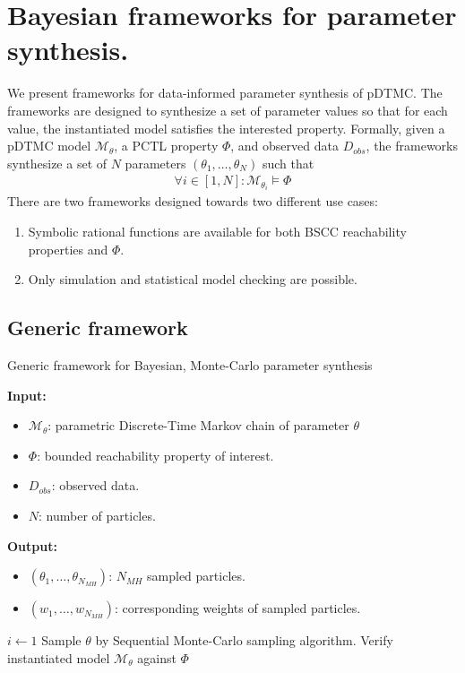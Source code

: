 \chapter{Bayesian frameworks for parameter synthesis.}
We present frameworks for data-informed parameter synthesis of pDTMC. The frameworks are designed to
synthesize a set of parameter values so that for each value, the instantiated model satisfies the
interested property. Formally, given a pDTMC model $\mathcal{M}_\theta$, a PCTL property $\Phi$, and
observed data $D_{obs}$, the frameworks synthesize a set of $N$ parameters
$(\theta_1,\ldots,\theta_N)$ such that
\begin{align*}
      \forall i \in [1,N]: \mathcal{M}_{\theta_i} \models \Phi
\end{align*}
There are two frameworks designed towards two different use cases:
\begin{enumerate}
      \item Symbolic rational functions are available for both BSCC reachability properties and $\Phi$.
      \item Only simulation and statistical model checking are possible.
\end{enumerate}

\section{Generic framework}
\begin{algorithm}[H]
      \caption{Generic framework for Bayesian, Monte-Carlo parameter synthesis}
      \label{alg:generic-framework}
      \hspace*{\algorithmicindent} \textbf{Input:}
      \begin{itemize}
            \item $\mathcal{M}_\theta$: parametric Discrete-Time Markov chain of parameter $\theta$
            \item $\Phi$: bounded reachability property of interest.
            \item $D_{obs}$: observed data.
            \item $N$: number of particles.
      \end{itemize}
      \hspace*{\algorithmicindent} \textbf{Output:}
      \begin{itemize}
            \item $(\theta_1,\ldots,\theta_{N_{MH}})$: $N_{MH}$ sampled particles.
            \item $(w_1,\ldots,w_{N_{MH}})$: corresponding weights of sampled particles.
      \end{itemize}
      \begin{algorithmic}[1]
            \State $i \leftarrow 1$
            \State Sample $\theta$ by Sequential Monte-Carlo sampling algorithm.
            \State Verify instantiated model $\mathcal{M}_\theta$ against $\Phi$
            \EndIf
            \EndWhile
            \EndProcedure
      \end{algorithmic}
\end{algorithm}

